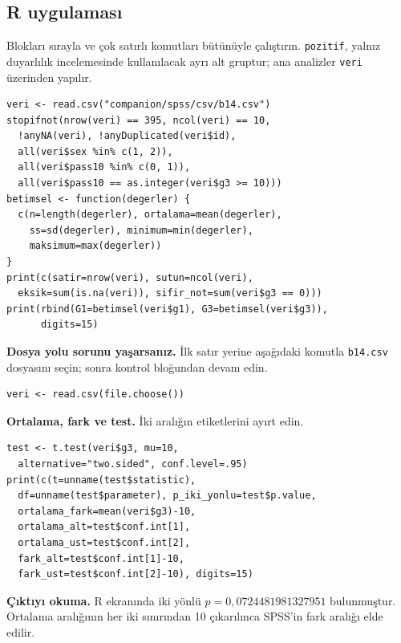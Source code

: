 \par\noindent\begin{minipage}{\linewidth}
\subsection{R uygulaması}
\label{sec:r-gercek-b14}

Blokları sırayla ve çok satırlı komutları bütünüyle çalıştırın.
\texttt{pozitif}, yalnız duyarlılık incelemesinde kullanılacak ayrı
alt gruptur; ana analizler \texttt{veri} üzerinden yapılır.

\begin{lstlisting}[style=prismR]
veri <- read.csv("companion/spss/csv/b14.csv")
stopifnot(nrow(veri) == 395, ncol(veri) == 10,
  !anyNA(veri), !anyDuplicated(veri$id),
  all(veri$sex %in% c(1, 2)),
  all(veri$pass10 %in% c(0, 1)),
  all(veri$pass10 == as.integer(veri$g3 >= 10)))
betimsel <- function(degerler) {
  c(n=length(degerler), ortalama=mean(degerler),
    ss=sd(degerler), minimum=min(degerler),
    maksimum=max(degerler))
}
print(c(satir=nrow(veri), sutun=ncol(veri),
  eksik=sum(is.na(veri)), sifir_not=sum(veri$g3 == 0)))
print(rbind(G1=betimsel(veri$g1), G3=betimsel(veri$g3)),
      digits=15)
\end{lstlisting}
\end{minipage}\par

\textbf{Dosya yolu sorunu yaşarsanız.} İlk satır yerine aşağıdaki
komutla \texttt{b14.csv} dosyasını seçin; sonra kontrol bloğundan
devam edin.
\begin{lstlisting}[style=prismR]
veri <- read.csv(file.choose())
\end{lstlisting}

\par\noindent\begin{minipage}{\linewidth}
\textbf{Ortalama, fark ve test.} İki aralığın etiketlerini ayırt edin.

\begin{lstlisting}[style=prismR]
test <- t.test(veri$g3, mu=10,
  alternative="two.sided", conf.level=.95)
print(c(t=unname(test$statistic),
  df=unname(test$parameter), p_iki_yonlu=test$p.value,
  ortalama_fark=mean(veri$g3)-10,
  ortalama_alt=test$conf.int[1],
  ortalama_ust=test$conf.int[2],
  fark_alt=test$conf.int[1]-10,
  fark_ust=test$conf.int[2]-10), digits=15)
\end{lstlisting}

\textbf{Çıktıyı okuma.} R ekranında iki yönlü
$p=0{,}0724481981327951$ bulunmuştur. Ortalama aralığının
her iki sınırından 10 çıkarılınca SPSS'in fark aralığı elde edilir.
\end{minipage}\par

